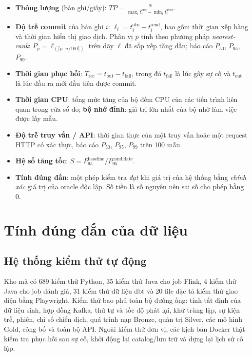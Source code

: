 \begin{itemize}
    \item \textbf{Thông lượng} (bản ghi/giây): $\displaystyle \mathit{TP} = \frac{N}{\max_i t^{\mathrm{obs}}_i - \min_i t^{\mathrm{send}}_i}$.
    \item \textbf{Độ trễ commit} của bản ghi $i$: $\ell_i = t^{\mathrm{obs}}_i - t^{\mathrm{send}}_i$, bao gồm thời gian xếp hàng và thời gian hiển thị giao dịch. Phân vị $p$ tính theo phương pháp \emph{nearest-rank}: $P_p = \ell_{(\lceil p \cdot n / 100 \rceil)}$ trên dãy $\ell$ đã sắp xếp tăng dần; báo cáo $P_{50}$, $P_{95}$, $P_{99}$.
    \item \textbf{Thời gian phục hồi}: $T_{\mathrm{rec}} = t_{\mathrm{out}} - t_{\mathrm{fail}}$, trong đó $t_{\mathrm{fail}}$ là lúc gây sự cố và $t_{\mathrm{out}}$ là lúc đầu ra mới đầu tiên được commit.
    \item \textbf{Thời gian CPU}: tổng mức tăng của bộ đếm CPU của các tiến trình liên quan trong cửa sổ đo; \textbf{bộ nhớ đỉnh}: giá trị lớn nhất của bộ nhớ làm việc được lấy mẫu.
    \item \textbf{Độ trễ truy vấn / API}: thời gian thực của một truy vấn hoặc một request HTTP có xác thực, báo cáo $P_{50}$, $P_{95}$, $P_{99}$ trên 100 mẫu.
    \item \textbf{Hệ số tăng tốc}: $S = P_{95}^{\mathrm{baseline}} / P_{95}^{\mathrm{candidate}}$.
    \item \textbf{Tính đúng đắn}: một phép kiểm tra \emph{đạt} khi giá trị của hệ thống bằng \emph{chính xác} giá trị của oracle độc lập. Số tiền là số nguyên nên sai số cho phép bằng 0.
\end{itemize}

\section{Tính đúng đắn của dữ liệu}
\label{sec:c5-dung-dan}

\subsection{Hệ thống kiểm thử tự động}
\label{sec:c5-kiem-thu}
Kho mã có 689 kiểm thử Python, 35 kiểm thử Java cho job Flink, 4 kiểm thử Java cho job đánh giá, 31 kiểm thử dữ liệu dbt và 20 file đặc tả kiểm thử giao diện bằng Playwright. Kiểm thử bao phủ toàn bộ đường ống: tính tất định của dữ liệu sinh, hợp đồng Kafka, thứ tự và tốc độ phát lại, khử trùng lặp, sự kiện trễ, phiên, chỉ số chiến dịch, quá trình nạp Bronze, quản trị Silver, các mô hình Gold, công bố và toàn bộ API. Ngoài kiểm thử đơn vị, các kịch bản Docker thật kiểm tra phục hồi sau sự cố, khởi động lại catalog/lưu trữ và dựng lại lịch sử cô lập.

